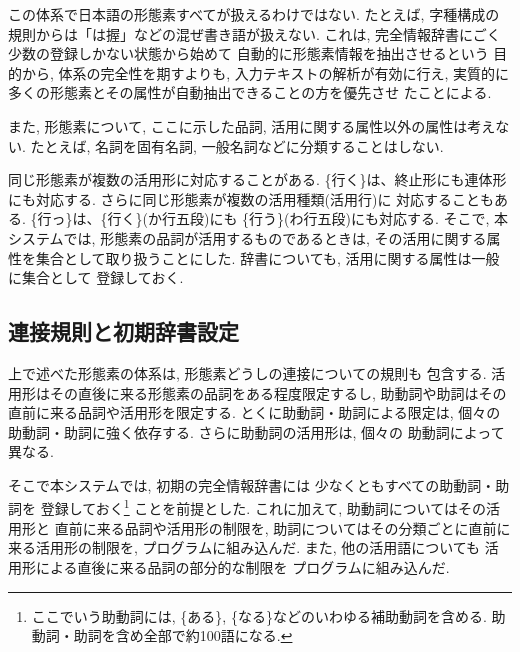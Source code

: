 この体系で日本語の形態素すべてが扱えるわけではない.  
たとえば, 字種構成の規則からは「は握」などの混ぜ書き語が扱えない.  
これは, 完全情報辞書にごく少数の登録しかない状態から始めて
自動的に形態素情報を抽出させるという
目的から, 体系の完全性を期すよりも, 入力テキストの解析が有効に行え, 実質的に
多くの形態素とその属性が自動抽出できることの方を優先させ
たことによる.  

また, 形態素について,
ここに示した品詞, 活用に関する属性以外の属性は考えない.
たとえば, 名詞を固有名詞, 一般名詞などに分類することはしない.

同じ形態素が複数の活用形に対応することがある.  
\{行く\}は、終止形にも連体形にも対応する.
さらに同じ形態素が複数の活用種類(活用行)に
対応することもある.
\{行っ\}は、\{行く\}\hspace{0.3mm}(か\hspace{0.2mm}行\hspace{0.2mm}五\hspace{0.2mm}段)にも
\{行う\}(わ\hspace{0.2mm}行\hspace{0.2mm}五\hspace{0.2mm}段)\hspace{0.3mm}にも対応する.
そこで, \hspace{0.2mm}本システムでは, 
\hspace{0.2mm}形\hspace{0.2mm}態\hspace{0.2mm}素の品\hspace{0.2mm}詞が活用するものであるときは, 
その活用に関する属性を集合として取り扱うことにした.  
辞書についても, 活用に関する属性は一般に集合として
登録しておく.  

\subsection{連接規則と初期辞書設定}
\label{init_info}
上で述べた形態素の体系は, 形態素どうしの連接についての規則も
包含する.  
活用形はその直後に来る形態素の品詞をある程度限定するし, 
助動詞や助詞はその
直前に来る品詞や活用形を限定する.  とくに助動詞・助詞による限定は, 
個々の助動詞・助詞に強く依存する.  さらに助動詞の活用形は, 個々の
助動詞によって異なる.  

そこで本システムでは, 初期の完全情報辞書には
少なくともすべての助動詞・助詞を
登録しておく\footnote{
ここでいう助動詞には, \{ある\}, \{なる\}などのいわゆる補助動詞を含める.  
助動詞・助詞を含め全部で約100語になる.  }
ことを前提とした.  これに加えて, 助動詞についてはその活用形と
直前に来る品詞や活用形の制限を, 助詞についてはその分類ごとに直前に
来る活用形の制限を, プログラムに組み込んだ.  
また, 他の活用語についても
活用形による直後に来る品詞の部分的な制限を
プログラムに組み込んだ.  


